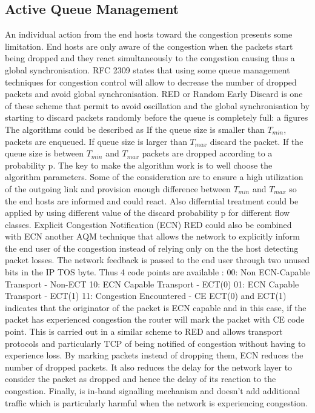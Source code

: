 \subsection{Active Queue Management}

An individual action from the end hosts toward the congestion presents some limitation. End hosts are only aware of the congestion when the packets start being dropped and they react simultaneously to the congestion causing thus a global synchronisation. RFC 2309 states that using some queue management techniques for congestion control will allow to decrease the number of dropped packets and avoid global synchronisation. 
RED or Random Early Discard is one of these scheme that permit to avoid oscillation and the global synchronisation by starting to discard packets randomly before the queue is completely full:
a figures
The algorithms could be described as
If the queue size is smaller than $T_{min}$, packets are enqueued.
If queue size is larger than $T_{max}$ discard the packet.
If the queue size is between $T_{min}$ and $T_{max}$ packets are dropped according to a probability p.
The key to make the algorithm work is to well choose the algorithm parameters. Some of the consideration are to ensure a high utilization of the outgoing link and provision enough difference between $T_{min}$ and $T_{max}$ so the end hosts are informed and could react. Also differntial treatment could be applied by using different value of the discard probability p for different flow classes. 
Explicit Congestion Notification (ECN)
RED could also be combined with ECN \cite {RFC 2481} another AQM technique that allows the network to explicitly inform the end user of the congestion instead of relying only on the the host detecting packet losses. The network feedback is passed to the end user through two unused bits in the IP TOS byte.  Thus 4 code points are available :
00: Non ECN-Capable Transport - Non-ECT 
10: ECN Capable Transport - ECT(0) 
01: ECN Capable Transport - ECT(1) 
11: Congestion Encountered - CE 
ECT(0) and ECT(1) indicates that the originator of the packet is ECN capable and in this case, if the packet has experienced congestion the router will mark the packet with CE code point. This is carried out in a similar scheme to RED and allows transport protocols and particularly TCP of being notified of congestion without having to experience loss. 
By marking packets instead of dropping them, ECN reduces the number of dropped packets. It also reduces the delay for the network layer to consider the packet as dropped and hence the delay of its reaction to the congestion. Finally, is in-band signalling mechanism and doesn't add additional traffic which is particularly harmful when the network is experiencing congestion.




